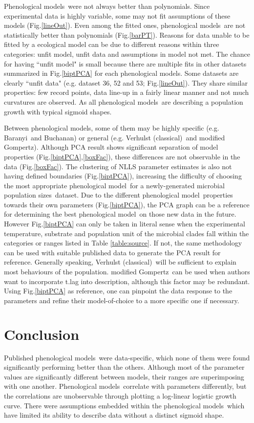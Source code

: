 \documentclass[a4paper, 11pt]{article}
\newcommand{\pml}{phenological model}
\newcommand{\pms}{phenological models}
\newcommand{\Pms}{Phenological models}
\newcommand{\fve}{Verhulst (classical)}
\newcommand{\fgo}{modified Gompertz}
\newcommand{\fba}{Baranyi}
\newcommand{\fbu}{Buchanan}
\newcommand{\pps}{population sizes}
\begin{document}
	\Pms\ were not always better than polynomials.  Since experimental data is highly variable, some may not fit assumptions of these models (Fig.\ref{lineOut}).  Even among the fitted ones, \pms\ are not statistically better than polynomials (Fig.\ref{barPT}).  Reasons for data unable to be fitted by a ecological model can be due to different reasons within three categories: unfit model, unfit data and assumptions in model not met.  The chance for having ``unfit model" is small because there are multiple fits in other datasets summarized in Fig.\ref{biptPCA} for each \pms.  Some datasets are clearly ``unfit data" (e.g. dataset 36, 52 and 53; Fig.\ref{lineOut}).  They share similar properties: few record points, data line-up in a fairly linear manner and not much curvatures are observed.  As all \pms\ are describing a population growth with typical sigmoid shapes.
	
	Between \pms, some of them may be highly specific (e.g. \fba\ and \fbu) or general (e.g. \fve\ and \fgo).  Although PCA result shows significant separation of model properties (Fig.\ref{biptPCA},\ref{boxFac}), these differences are not observable in the data (Fig.\ref{boxFac}).  The clustering of NLLS parameter estimates is also not having defined boundaries (Fig.\ref{biptPCA}), increasing the difficulty of choosing the most appropriate \pml\ for a newly-generated microbial \pps\ dataset.  Due to the different \pml\ properties towards their own parameters (Fig.\ref{biptPCA}), the PCA graph can be a reference for determining the best \pml\ on those new data in the future.  However Fig.\ref{biptPCA} can only be taken in literal sense when the experimental temperature, substrate and population unit of the microbial clades fall within the categories or ranges listed in Table \ref{table:source}.  If not, the same methodology can be used with suitable published data to generate the PCA result for reference.  Generally speaking, \fve\ will be sufficient to explain most behaviours of the population.  \fgo\ can be used when authors want to incorporate t.lag into description, although this factor may be redundant.  Using Fig.\ref{biptPCA} as reference, one can pinpoint the data response to the parameters and refine their model-of-choice to a more specific one if necessary.
	
	\section*{Conclusion}
	Published \pms\ were data-specific, which none of them were found significantly performing better than the others.  Although most of the parameter values are significantly different between models, their ranges are superimposing with one another.  \Pms\ correlate with parameters differently, but the correlations are unobservable through plotting a log-linear logistic growth curve.  There were assumptions embedded within the \pms\ which have limited its ability to describe data without a distinct sigmoid shape.
	
\end{document}
